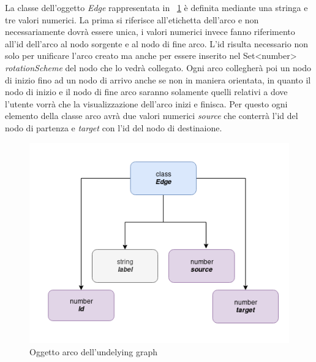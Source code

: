 {La classe dell'oggetto \textit{Edge} rappresentata in \figurename~\ref{fig:edgeClass} è definita mediante una stringa e tre valori numerici. La prima si riferisce all'etichetta dell'arco e non necessariamente dovrà essere unica, i valori numerici invece fanno riferimento all'id dell'arco al nodo sorgente e al nodo di fine arco. L'id risulta necessario non solo per unificare l'arco creato ma anche per essere inserito nel Set<number> \textit{rotationScheme} del nodo che lo vedrà collegato. Ogni arco collegherà poi un nodo di inizio fino ad un nodo di arrivo anche se non in maniera orientata, in quanto il nodo di inizio e il nodo di fine arco saranno solamente quelli relativi a dove l'utente vorrà che la visualizzazione dell'arco inizi e finisca. Per questo ogni elemento della classe arco avrà due valori numerici \textit{source} che conterrà l'id del nodo di partenza e \textit{target} con l'id del nodo di destinaione.
\newpage
\begin{figure}[!htb]
	\begin{center}
		\includegraphics[width=1 \linewidth]{figure/edgeClass}
	\end{center}
	\caption{Oggetto arco dell'undelying graph\label{fig:edgeClass}}
\end{figure}

}
